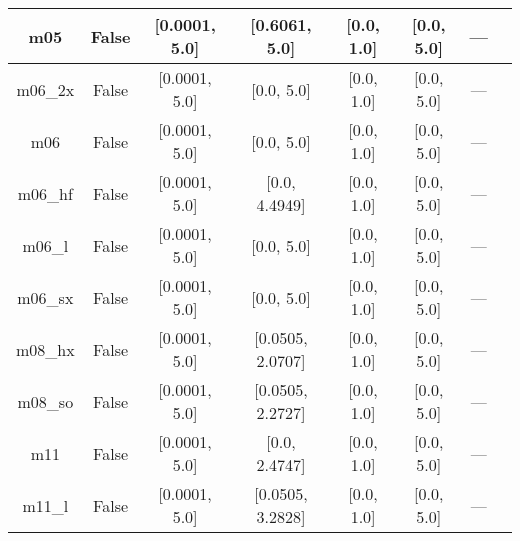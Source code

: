 \begin{tabular}{|c|c|c|c|c|c|c|l|}
          m05 &                 False &    [0.0001, 5.0] &    [0.6061, 5.0] &       [0.0, 1.0] &     [0.0, 5.0] &        --- &                                                             \cite{Zhao2005_161103} \\ \hline
      m06\_2x &                 False &    [0.0001, 5.0] &       [0.0, 5.0] &       [0.0, 1.0] &     [0.0, 5.0] &        --- &                                                                \cite{Zhao2008_215} \\ \hline
          m06 &                 False &    [0.0001, 5.0] &       [0.0, 5.0] &       [0.0, 1.0] &     [0.0, 5.0] &        --- &                                                                \cite{Zhao2008_215} \\ \hline
      m06\_hf &                 False &    [0.0001, 5.0] &    [0.0, 4.4949] &       [0.0, 1.0] &     [0.0, 5.0] &        --- &                                                              \cite{Zhao2006_13126} \\ \hline
       m06\_l &                 False &    [0.0001, 5.0] &       [0.0, 5.0] &       [0.0, 1.0] &     [0.0, 5.0] &        --- &                                                \cite{Zhao2006_194101,Zhao2008_215} \\ \hline
      m06\_sx &                 False &    [0.0001, 5.0] &       [0.0, 5.0] &       [0.0, 1.0] &     [0.0, 5.0] &        --- &                                                               \cite{Wang2020_2294} \\ \hline
      m08\_hx &                 False &    [0.0001, 5.0] & [0.0505, 2.0707] &       [0.0, 1.0] &     [0.0, 5.0] &        --- &                                                               \cite{Zhao2008_1849} \\ \hline
      m08\_so &                 False &    [0.0001, 5.0] & [0.0505, 2.2727] &       [0.0, 1.0] &     [0.0, 5.0] &        --- &                                                               \cite{Zhao2008_1849} \\ \hline
          m11 &                 False &    [0.0001, 5.0] &    [0.0, 2.4747] &       [0.0, 1.0] &     [0.0, 5.0] &        --- &                                                           \cite{Peverati2011_2810} \\ \hline
       m11\_l &                 False &    [0.0001, 5.0] & [0.0505, 3.2828] &       [0.0, 1.0] &     [0.0, 5.0] &        --- &                                                            \cite{Peverati2012_117} \\ \hline

\end{tabular}
